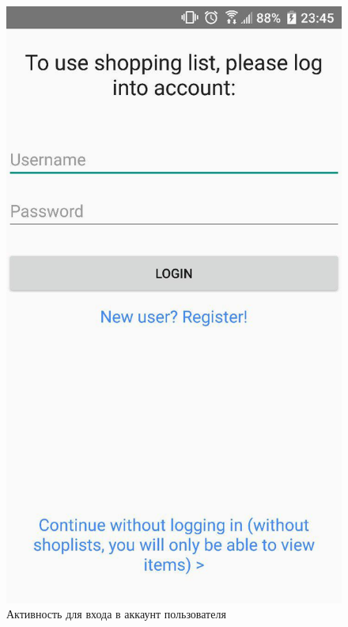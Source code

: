 \begin{my_enumerate}
\begin{figure}[h!]
            \includegraphics[height=0.42\textheight]{./screenshots/3/login.jpg}
            \caption{\small{Активность для входа в аккаунт пользователя}}
            \label{login_activity}
            \endminipage\hfill

\end{figure}
\end{my_enumerate}

